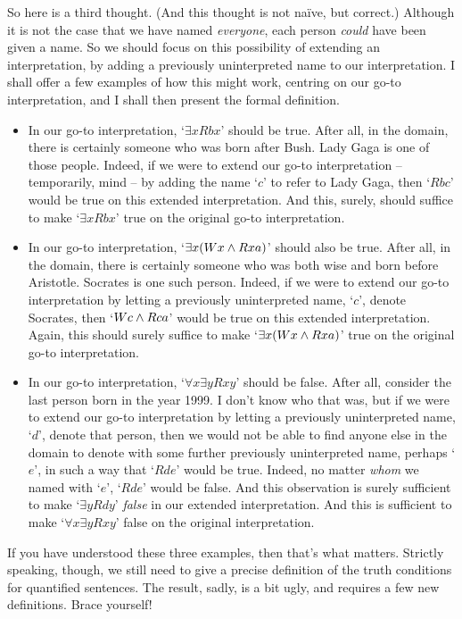 So here is a third thought. (And this thought is not naïve, but correct.) Although it is not the case that we have named \emph{everyone}, each person \emph{could} have been given a name. So we should focus on this possibility of extending an interpretation, by adding a previously uninterpreted name to our interpretation. I shall offer a few examples of how this might work, centring on our go-to interpretation, and I shall then present the formal definition. 
\begin{itemize}
	\item In our go-to interpretation, `$\exists x Rbx$' should be true. After all, in the domain, there is certainly someone who was born after Bush. Lady Gaga is one of those people. Indeed, if we were to extend our go-to interpretation – temporarily, mind – by adding the name `$c$' to refer to Lady Gaga, then `$Rbc$' would be true on this extended interpretation. And this, surely, should suffice to make `$\exists x Rbx$' true on the original go-to interpretation. 
	\item In our go-to interpretation, `$\exists x (Wx \wedge Rxa)$' should also be true. After all, in the domain, there is certainly someone who was both wise and born before Aristotle. Socrates is one such person. Indeed, if we were to extend our go-to interpretation by letting a previously uninterpreted name, `$c$', denote Socrates, then `$Wc \wedge Rca$' would be true on this extended interpretation. Again, this should surely suffice to make `$\exists x (Wx \wedge Rxa)$' true on the original go-to interpretation. 
	\item In our go-to interpretation, `$\forall x \exists y Rxy$' should be false. After all, consider the last person born in the year 1999. I don't know who that was, but if we were to extend our go-to interpretation by letting a previously uninterpreted name, `$d$', denote that person, then we would not be able to find anyone else in the domain to denote with some further previously uninterpreted name, perhaps `$e$', in such a way that `$Rde$' would be true. Indeed, no matter \emph{whom} we named with `$e$', `$Rde$' would be false. And this observation is surely sufficient to make `$\exists y Rdy$' \emph{false} in our extended interpretation. And this is sufficient to make `$\forall x \exists y Rxy$' false on the original interpretation.
\end{itemize}

If you have understood these three examples, then that's what matters. Strictly speaking, though, we still need to give a precise definition of the truth conditions for quantified sentences. The result, sadly, is a bit ugly, and requires a few new definitions. Brace yourself!

